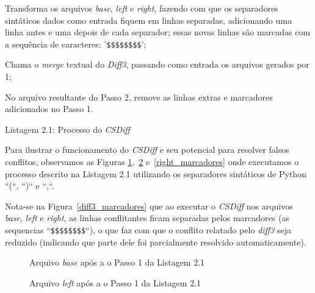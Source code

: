 \begin{center}
	\centering
	\begin{compactenum}[(1)]
		\item Transforma os arquivos \emph{base}, \emph{left} e
		\emph{right}, fazendo com que os separadores sintáticos dados
		como entrada fiquem em linhas separadas, adicionando uma linha
		antes e uma depois de cada separador; essas novas linhas são
		marcadas com a sequência de caracteres: '\verb|$$$$$$$$|';
		\item Chama o \emph{merge} textual do \emph{Diff3}, passando como
		entrada os arquivos gerados por 1;
		\item No arquivo resultante do Passo 2, remove as linhas extras e
		marcadores adicionados no Passo 1.
	\end{compactenum}
	{Listagem 2.1: Processo do \emph{CSDiff}}\\ %
	\label{csdiff_process}
\end{center}

Para ilustrar o funcionamento do \emph{CSDiff} e seu potencial para resolver
falsos conflitos, observamos as Figuras
\ref{base_marcadores},~\ref{left_marcadores} e~\ref{right_marcadores} onde
executamos o processo descrito na Listagem 2.1 utilizando os
separadores sintáticos de Python ``(``, ``)``  e ``,``.

Nota-se na Figura~\ref{diff3_marcadores} que ao executar o \emph{CSDiff} nos
arquivos \emph{base}, \emph{left} e \emph{right}, as linhas conflitantes ficam
separadas pelos marcadores (as sequencias ``\verb|$$$$$$$$|``), o que faz com que
o conflito relatado pelo \emph{diff3} seja reduzido (indicando que parte dele
foi parcialmente resolvido automaticamente).

\begin{figure}[ht]
	\begin{center}
		
		\caption{Arquivo \emph{base} após a o Passo 1 da
			Listagem 2.1}\label{base_marcadores}
	\end{center}
\end{figure}

\begin{figure}[ht]
	\begin{center}
		
		\caption{Arquivo \emph{left} após a o Passo 1 da
			Listagem 2.1}\label{left_marcadores}
	\end{center}
\end{figure}

